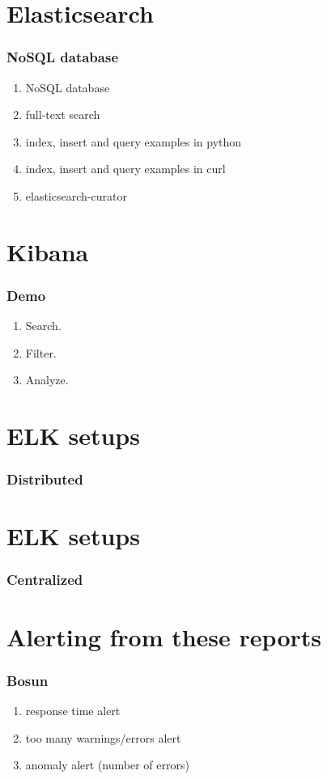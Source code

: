 \documentclass[13pt, ignorenonframetext]{beamer}
\begin{document}
\section{Elasticsearch}
\begin{frame}
\frametitle{NoSQL database}
\begin{enumerate}
\item NoSQL database
\item full-text search
\item index, insert and query examples in python
\item index, insert and query examples in curl
\item elasticsearch-curator
\end{enumerate}
\end{frame}

\section{Kibana}
\begin{frame}
\frametitle{Demo}
\begin{enumerate}
\item Search.
\item Filter.
\item Analyze.
\end{enumerate}
\end{frame}

\section{ELK setups}
\begin{frame}
\frametitle{Distributed}
\end{frame}

\section{ELK setups}
\begin{frame}
\frametitle{Centralized}
\end{frame}

\section{Alerting from these reports}
\begin{frame}
\frametitle{Bosun}
\begin{enumerate}
\item response time alert
\item too many warnings/errors alert
\item anomaly alert (number of errors)
\end{enumerate}
\end{frame}
\end{document}
